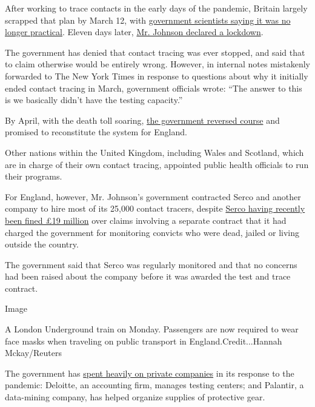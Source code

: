 After working to trace contacts in the early days of the pandemic,
Britain largely scrapped that plan by March 12, with
\href{https://assets.publishing.service.gov.uk/government/uploads/system/uploads/attachment_data/file/886989/s0007-spi-m-o-consensus-view-impact-interventions-030220-sage4.pdf}{government
scientists saying it was no longer practical}. Eleven days later,
\href{https://www.nytimes.com/2020/03/23/world/europe/coronavirus-uk-boris-johnson.html}{Mr.
Johnson declared a lockdown}.

The government has denied that contact tracing was ever stopped, and
said that to claim otherwise would be entirely wrong. However, in
internal notes mistakenly forwarded to The New York Times in response to
questions about why it initially ended contact tracing in March,
government officials wrote: ``The answer to this is we basically didn't
have the testing capacity.''

By April, with the death toll soaring,
\href{https://www.theguardian.com/world/2020/apr/17/uk-to-start-coronavirus-contact-tracing-again}{the
government reversed course} and promised to reconstitute the system for
England.

Other nations within the United Kingdom, including Wales and Scotland,
which are in charge of their own contact tracing, appointed public
health officials to run their programs.

For England, however, Mr. Johnson's government contracted Serco and
another company to hire most of its 25,000 contact tracers, despite
\href{https://www.bbc.co.uk/news/business-48853870}{Serco having
recently been fined £19 million} over claims involving a separate
contract that it had charged the government for monitoring convicts who
were dead, jailed or living outside the country.

The government said that Serco was regularly monitored and that no
concerns had been raised about the company before it was awarded the
test and trace contract.

Image

A London Underground train on Monday. Passengers are now required to
wear face masks when traveling on public transport in
England.Credit...Hannah Mckay/Reuters

The government has
\href{https://www.theguardian.com/business/2020/may/04/uk-government-using-crisis-to-transfer-nhs-duties-to-private-sector}{spent
heavily on private companies} in its response to the pandemic: Deloitte,
an accounting firm, manages testing centers; and Palantir, a data-mining
company, has helped organize supplies of protective gear.

